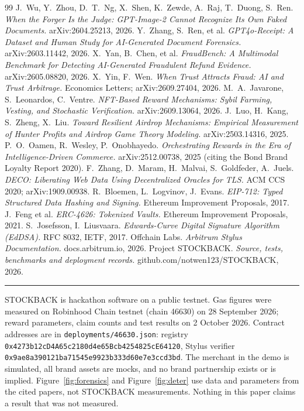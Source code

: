\documentclass[10.5pt,letterpaper]{article}
\theoremstyle{definition}
\theoremstyle{remark}
\newcommand{\ttt}[1]{\texttt{#1}}
\newcommand{\seal}[1]{%
  \tikz[baseline=-0.6ex]{\fill[shu] (0,0) circle (#1);
  \node[text=washi,font=\bfseries\fontsize{#1*1.5cm}{#1*1.5cm}\selectfont] at (0,0) {S};}}
\begin{document}
\begin{center}\seal{0.32cm}\end{center}

\small
\begin{thebibliography}{99}\setlength{\itemsep}{1pt}
 J.~Wu, Y.~Zhou, D.~T.~Ng, X.~Shen, K.~Zewde, A.~Raj, T.~Duong, S.~Ren. \emph{When the Forger Is the Judge: GPT-Image-2 Cannot Recognize Its Own Faked Documents.} arXiv:2604.25213, 2026.
 Y.~Zhang, S.~Ren, et al. \emph{GPT4o-Receipt: A Dataset and Human Study for AI-Generated Document Forensics.} arXiv:2603.11442, 2026.
 X.~Yan, B.~Chen, et al. \emph{FraudBench: A Multimodal Benchmark for Detecting AI-Generated Fraudulent Refund Evidence.} arXiv:2605.08820, 2026.
 X.~Yin, F.~Wen. \emph{When Trust Attracts Fraud: AI and Trust Arbitrage.} Economics Letters; arXiv:2609.27404, 2026.
 M.~A.~Javarone, S.~Leonardos, C.~Ventre. \emph{NFT-Based Reward Mechanisms: Sybil Farming, Vesting, and Stochastic Verification.} arXiv:2609.13064, 2026.
 J.~Luo, H.~Kang, S.~Zheng, X.~Liu. \emph{Toward Resilient Airdrop Mechanisms: Empirical Measurement of Hunter Profits and Airdrop Game Theory Modeling.} arXiv:2503.14316, 2025.
 P.~O.~Oamen, R.~Wesley, P.~Onobhayedo. \emph{Orchestrating Rewards in the Era of Intelligence-Driven Commerce.} arXiv:2512.00738, 2025 (citing the Bond Brand Loyalty Report 2020).
 F.~Zhang, D.~Maram, H.~Malvai, S.~Goldfeder, A.~Juels. \emph{DECO: Liberating Web Data Using Decentralized Oracles for TLS.} ACM CCS 2020; arXiv:1909.00938.
 R.~Bloemen, L.~Logvinov, J.~Evans. \emph{EIP-712: Typed Structured Data Hashing and Signing.} Ethereum Improvement Proposals, 2017.
 J.~Feng et al. \emph{ERC-4626: Tokenized Vaults.} Ethereum Improvement Proposals, 2021.
 S.~Josefsson, I.~Liusvaara. \emph{Edwards-Curve Digital Signature Algorithm (EdDSA).} RFC 8032, IETF, 2017.
 Offchain Labs. \emph{Arbitrum Stylus Documentation.} docs.arbitrum.io, 2026.
 Project STOCKBACK. \emph{Source, tests, benchmarks and deployment records.} github.com/notwen123/STOCKBACK, 2026.
\end{thebibliography}

\vspace{6pt}
\noindent\rule{\textwidth}{0.4pt}
\footnotesize
\noindent STOCKBACK is hackathon software on a public testnet. Gas figures were measured on Robinhood Chain testnet (chain 46630) on
28 September 2026; reward parameters, claim counts and test results on 2 October 2026. Contract addresses are in
\ttt{deployments/46630.json}: registry \ttt{0x4273b12cD4A65c2180d4e65Bcb4254825cE64120}, Stylus verifier
\ttt{0x9ae8a390121ba71545e9923b333d60e7e3ccd3bd}. The merchant in the demo is simulated, all brand assets are mocks, and
no brand partnership exists or is implied. Figure~\ref{fig:forensics} and Figure~\ref{fig:deter} use data and parameters from the cited
papers, not STOCKBACK measurements. Nothing in this paper claims a result that was not measured.
\end{document}
